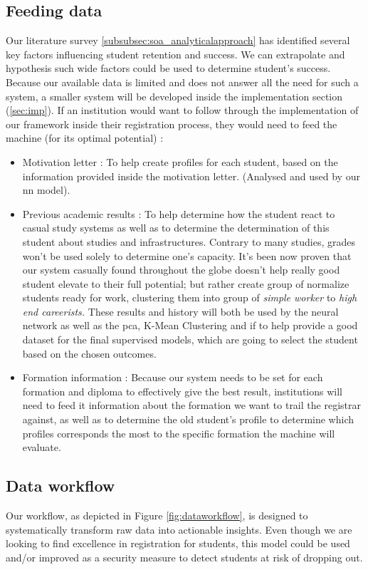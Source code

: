 \documentclass[../main.tex]{subfiles}
\begin{document}
\subsection{Feeding data}
\label{subsec:conprop_feedingdata}
Our literature survey \ref{subsubsec:soa_analyticalapproach} has identified several key factors influencing student retention and success. We can extrapolate and hypothesis such wide factors could be used to determine student's success.
Because our available data is limited and does not answer all the need for such a system, a smaller system will be developed inside the implementation section (\ref{sec:imp}). If an institution would want to follow through the implementation of our framework inside their registration process, they would need to feed the machine (for its optimal potential) : 
\begin{itemize}
    \item Motivation letter : To help create profiles for each student, based on the information provided inside the motivation letter. (Analysed and used by our \acrfull{nn} model).
    \item Previous academic results : To help determine how the student react to casual study systems as well as to determine the determination of this student about studies and infrastructures. Contrary to many studies, grades won't be used solely to determine one's capacity. It's been now proven that our system casually found throughout the globe doesn't help really good student elevate to their full potential; but rather create group of normalize students ready for work, clustering them into group of \textit{simple worker} to \textit{high end careerists.} These results and history will both be used by the neural network as well as the \acrfull{pca}, K-Mean Clustering and \acrfull{if} to help provide a good dataset for the final supervised models, which are going to select the student based on the chosen outcomes.
    \item Formation information : Because our system needs to be set for each formation and diploma to effectively give the best result, institutions will need to feed it information about the formation we want to trail the registrar against, as well as to determine the old student's profile to determine which profiles corresponds the most to the specific formation the machine will evaluate. 
\end{itemize}

\subsection{Data workflow}
\label{subsec:concimp_dataworkflow}
Our workflow, as depicted in Figure \ref{fig:dataworkflow}, is designed to systematically transform raw data into actionable insights. Even though we are looking to find excellence in registration for students, this model could be used and/or improved as a security measure to detect students at risk of dropping out.
\end{document}
